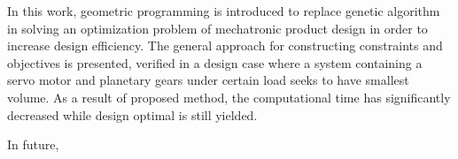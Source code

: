 In this work, geometric programming is introduced to replace genetic algorithm in solving an optimization problem of mechatronic product design in order to increase design efficiency. The general approach for constructing constraints and objectives is presented, verified in a design case where a system containing a servo motor and planetary gears under certain load seeks to have smallest volume. As a result of proposed method, the computational time has significantly decreased while design optimal is still yielded.

In future,